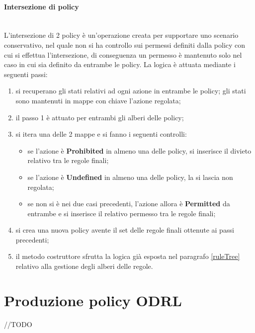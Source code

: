 \documentclass[12pt,a4paper,twoside]{book}
\begin{document}
\paragraph{Intersezione di policy}\mbox{}\\
L'intersezione di 2 policy è un'operazione creata per supportare uno scenario conservativo, nel quale non si ha controllo sui permessi definiti dalla policy con cui si effettua l'intersezione, di conseguenza un permesso è mantenuto solo nel caso in cui sia definito da entrambe le policy. La logica è attuata mediante i seguenti passi:
\begin{enumerate}
\item si recuperano gli stati relativi ad ogni azione in entrambe le policy; gli stati sono mantenuti in mappe con chiave l'azione regolata;
\item il passo 1 è attuato per entrambi gli alberi delle policy;
\item si itera una delle 2 mappe e si fanno i seguenti controlli:
\begin{itemize}
\item se l'azione è \textbf{Prohibited} in almeno una delle policy, si inserisce il divieto relativo tra le regole finali;
\item se l'azione è \textbf{Undefined} in almeno una delle policy, la si lascia non regolata;
\item se non si è nei due casi precedenti, l'azione allora è \textbf{Permitted} da entrambe e si inserisce il relativo permesso tra le regole finali;
\end{itemize}
\item si crea una nuova policy avente il set delle regole finali ottenute ai passi precedenti;
\item il metodo costruttore sfrutta la logica già esposta nel paragrafo \ref{ruleTree} relativo alla gestione degli alberi delle regole.
\end{enumerate}
\section{Produzione policy ODRL}
//TODO
{}

\end{document}
